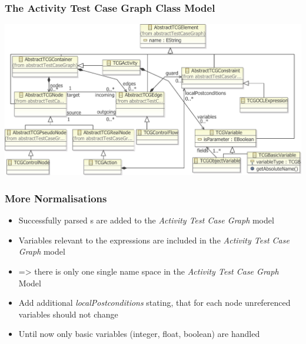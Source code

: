 \documentclass{beamer}
\begin{document}
\begin{frame}
\frametitle{The Activity Test Case Graph Class Model}
	\includegraphics[width=\textwidth]{pics/completeMetamodelforSlideshowN.pdf}
\end{frame}


\begin{frame}
\frametitle{More Normalisations}
\begin{itemize}
\item Successfully parsed s are added to the \emph{Activity Test Case Graph} model
\item Variables relevant to the expressions are included in the \emph{Activity Test Case Graph} model
\item => there is only one single name space in the \emph{Activity Test Case Graph} Model
\item Add additional \emph{localPostconditions} stating, that for each node unreferenced variables should not change
\item Until now only basic variables (integer, float, boolean) are handled
\end{itemize}
\end{frame}
\end{document}
